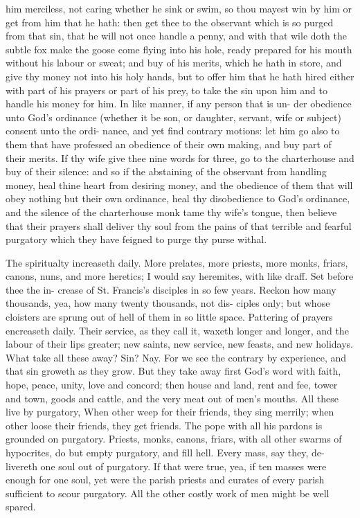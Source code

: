\documentclass{custom}
\begin{document}
him merciless, not caring whether he sink or swim, so thou 
mayest win by him or get from him that he hath: then get 
thee to the observant which is so purged from that sin, 
that he will not once handle a penny, and with that wile 
doth the subtle fox make the goose come flying into his 
hole, ready prepared for his mouth without his labour or 
sweat; and buy of his merits, which he hath in store, and 
give thy money not into his holy hands, but to offer him 
that he hath hired either with part of his prayers or part 
of his prey, to take the sin upon him and to handle his 
money for him. In like manner, if any person that is un- 
der obedience unto God's ordinance (whether it be son, or 
daughter, servant, wife or subject) consent unto the ordi- 
nance, and yet find contrary motions: let him go also to 
them that have professed an obedience of their own making, 
and buy part of their merits. If thy wife give thee nine 
words for three, go to the charterhouse and buy of their 
silence: and so if the abstaining of the observant from 
handling money, heal thine heart from desiring money, 
and the obedience of them that will obey nothing but their 
own ordinance, heal thy disobedience to God's ordinance, 
and the silence of the charterhouse monk tame thy wife's 
tongue, then believe that their prayers shall deliver thy 
soul from the pains of that terrible and fearful purgatory 
which they have feigned to purge thy purse withal. 

The spiritualty increaseth daily. More prelates, more 
priests, more monks, friars, canons, nuns, and more heretics; 
I would say heremites, with like draff. Set before thee the in- 
crease of St. Francis's disciples in so few years. Reckon how 
many thousands, yea, how many twenty thousands, not dis- 
ciples only; but whose cloisters are sprung out of hell of 
them in so little space. Pattering of prayers encreaseth 
daily. Their service, as they call it, waxeth longer and 
longer, and the labour of their lips greater; new saints, 
new service, new feasts, and new holidays. What take 
all these away? Sin? Nay. For we see the contrary 
by experience, and that sin groweth as they grow. But 
they take away first God's word with faith, hope, peace, 
unity, love and concord; then house and land, rent and 
fee, tower and town, goods and cattle, and the very meat 
out of men's mouths. All these live by purgatory, When 
other weep for their friends, they sing merrily; when 
other loose their friends, they get friends. The pope with 
all his pardons is grounded on purgatory. Priests, monks, 
canons, friars, with all other swarms of hypocrites, do but 
empty purgatory, and fill hell. Every mass, say they, de- 
livereth one soul out of purgatory. If that were true, 
yea, if ten masses were enough for one soul, yet were the 
parish priests and curates of every parish sufficient to 
scour purgatory. All the other costly work of men might 
be well spared. 
\end{document}
